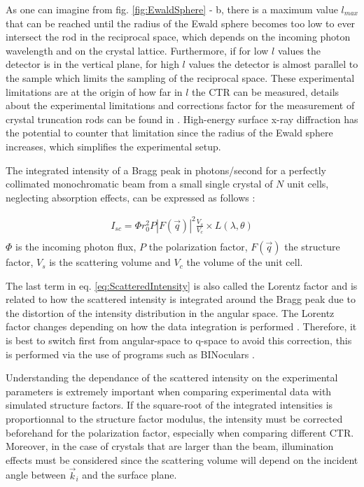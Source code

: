 As one can imagine from fig. \ref{fig:EwaldSphere} - b, there is a maximum value $l_{max}$ that can be reached until the radius of the Ewald sphere becomes too low to ever intersect the rod in the reciprocal space, which depends on the incoming photon wavelength and on the crystal lattice.
Furthermore, if for low $l$ values the detector is in the vertical plane, for high $l$ values the detector is almost parallel to the sample which limits the sampling of the reciprocal space.
These experimental limitations are at the origin of how far in $l$ the CTR can be measured, details about the experimental limitations and corrections factor for the measurement of crystal truncation rods can be found in \cite{Vlieg1997, Drnec2014}.
High-energy surface x-ray diffraction \parencite{Gustafson2014, Harlow2020, Hejral2021} has the potential to counter that limitation since the radius of the Ewald sphere increases, which simplifies the experimental setup.

The integrated intensity of a Bragg peak in photons/second for a perfectly collimated monochromatic beam from a small single crystal of $N$ unit cells, neglecting absorption effects, can be expressed as follows \parencite{NielsenMcMorrow}:

\begin{gather}
    \label{eq:ScatteredIntensity}
    I_{sc} = \Phi r_0^2 P |F(\vec{q})|^2 \frac{V_s}{V_c} \times L(\lambda, \theta)\\
\end{gather}
$\Phi$ is the incoming photon flux, $P$ the polarization factor, $F(\vec{q})$ the structure factor, $V_s$ is the scattering volume and $V_c$ the volume of the unit cell.

The last term in eq. \ref{eq:ScatteredIntensity} is also called the Lorentz factor and is related to how the scattered intensity is integrated around the Bragg peak due to the distortion of the intensity distribution in the angular space.
The Lorentz factor changes depending on how the data integration is performed \parencite{Robach2000, Drnec2014}.
Therefore, it is best to switch first from angular-space to q-space to avoid this correction, this is performed via the use of programs such as BINoculars \parencite{Roobol2015}.

Understanding the dependance of the scattered intensity on the experimental parameters is extremely important when comparing experimental data with simulated structure factors.
If the square-root of the integrated intensities is proportionnal to the structure factor modulus, the intensity must be corrected beforehand for the polarization factor, especially when comparing different CTR.
Moreover, in the case of crystals that are larger than the beam, illumination effects must be considered since the scattering volume will depend on the incident angle between $\vec{k}_i$ and the surface plane.

